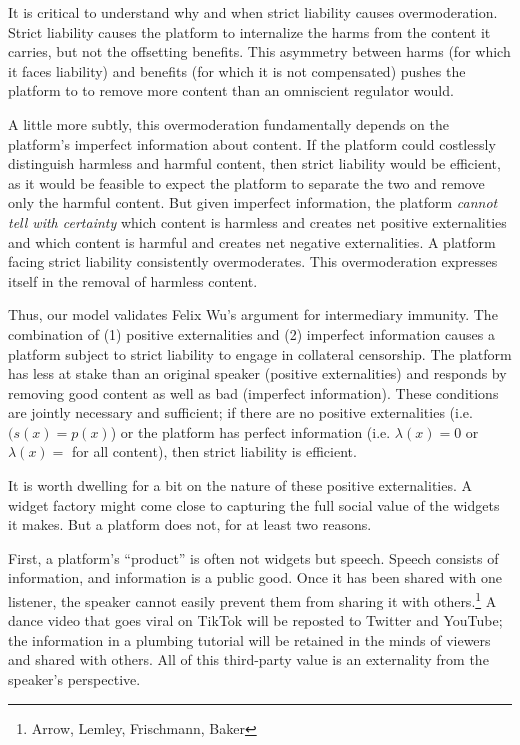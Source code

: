 It is critical to understand why and when strict liability causes overmoderation. Strict liability causes the platform to internalize the harms from the content it carries, but not the offsetting benefits. This asymmetry between harms (for which it faces liability) and benefits (for which it is not compensated) pushes the platform to to remove more content than an omniscient regulator would.

A little more subtly, this overmoderation fundamentally depends on the platform's imperfect information about content. If the platform could costlessly distinguish harmless and harmful content, then strict liability would be efficient, as it would be feasible to expect the platform to separate the two and remove only the harmful content. But given imperfect information, the platform \emph{cannot tell with certainty} which content is harmless and creates net positive externalities and which content is harmful and creates net negative externalities. A platform facing strict liability consistently overmoderates. This overmoderation expresses itself in the removal of harmless content.

Thus, our model validates Felix Wu's argument for intermediary immunity. The combination of (1) positive externalities and (2) imperfect information causes a platform subject to strict liability to engage in collateral censorship. The platform has less at stake than an original speaker (positive externalities) and responds by removing good content as well as bad (imperfect information). These conditions are jointly necessary and sufficient; if there are no positive externalities (i.e. $(s(x) = p(x)$) or the platform has perfect information (i.e. $\lambda(x) =0 $ or $\lambda(x) =$ for all content), then strict liability is efficient.

It is worth dwelling for a bit on the nature of these positive externalities. A widget factory might come close to capturing the full social value of the widgets it makes. But a platform does not, for at least two reasons.

First, a platform's ``product'' is often not widgets but speech. Speech consists of information, and information is a public good. Once it has been shared with one listener, the speaker cannot easily prevent them from sharing it with others.\footnote{Arrow, Lemley, Frischmann, Baker} A dance video that goes viral on TikTok will be reposted to Twitter and YouTube; the information in a plumbing tutorial will be retained in the minds of viewers and shared with others. All of this third-party value is an externality from the speaker's perspective.

